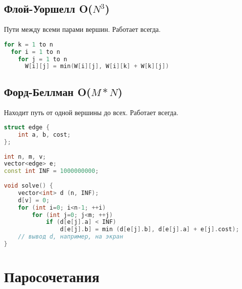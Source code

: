 \subsection{Флой-Уоршелл O($N^3$)}
Пути между всеми парами вершин. Работает всегда.
\begin{lstlisting}[language=C++]
for k = 1 to n
  for i = 1 to n
    for j = 1 to n
      W[i][j] = min(W[i][j], W[i][k] + W[k][j])
\end{lstlisting}
\subsection{Форд-Беллман O($M*N$) }
Находит путь от одной вершины до всех. Работает всегда.
\begin{lstlisting}[language=C++]
struct edge {
	int a, b, cost;
};
 
int n, m, v;
vector<edge> e;
const int INF = 1000000000;
 
void solve() {
	vector<int> d (n, INF);
	d[v] = 0;
	for (int i=0; i<n-1; ++i)
		for (int j=0; j<m; ++j)
			if (d[e[j].a] < INF)
				d[e[j].b] = min (d[e[j].b], d[e[j].a] + e[j].cost);
	// вывод d, например, на экран
}
\end{lstlisting}
\section{Паросочетания}
